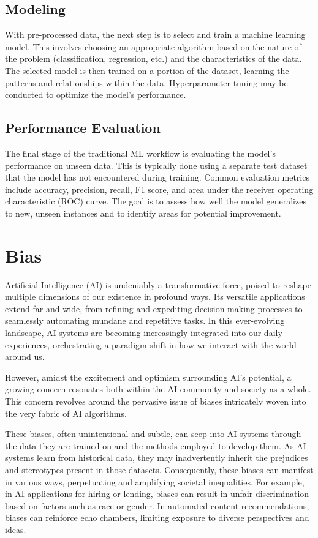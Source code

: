 \documentclass[12pt,a4paper,openright,twoside]{book}
\begin{document}
\subsection{Modeling}

With pre-processed data, the next step is to select and train a machine learning model. This involves choosing an appropriate algorithm based on the nature of the problem (classification, regression, etc.) and the characteristics of the data. The selected model is then trained on a portion of the dataset, learning the patterns and relationships within the data. Hyperparameter tuning may be conducted to optimize the model's performance.

\subsection{Performance Evaluation}

The final stage of the traditional ML workflow is evaluating the model's performance on unseen data. This is typically done using a separate test dataset that the model has not encountered during training. Common evaluation metrics include accuracy, precision, recall, F1 score, and area under the receiver operating characteristic (ROC) curve. The goal is to assess how well the model generalizes to new, unseen instances and to identify areas for potential improvement.

\newpage
\section{Bias}

Artificial Intelligence (AI) is undeniably a transformative force, poised to reshape multiple dimensions of our existence in profound ways. Its versatile applications extend far and wide, from refining and expediting decision-making processes to seamlessly automating mundane and repetitive tasks. In this ever-evolving landscape, AI systems are becoming increasingly integrated into our daily experiences, orchestrating a paradigm shift in how we interact with the world around us. 

However, amidst the excitement and optimism surrounding AI's potential, a growing concern resonates both within the AI community and society as a whole. This concern revolves around the pervasive issue of biases intricately woven into the very fabric of AI algorithms. 

These biases, often unintentional and subtle, can seep into AI systems through the data they are trained on and the methods employed to develop them. As AI systems learn from historical data, they may inadvertently inherit the prejudices and stereotypes present in those datasets. Consequently, these biases can manifest in various ways, perpetuating and amplifying societal inequalities. For example, in AI applications for hiring or lending, biases can result in unfair discrimination based on factors such as race or gender. In automated content recommendations, biases can reinforce echo chambers, limiting exposure to diverse perspectives and ideas. 
\end{document}
